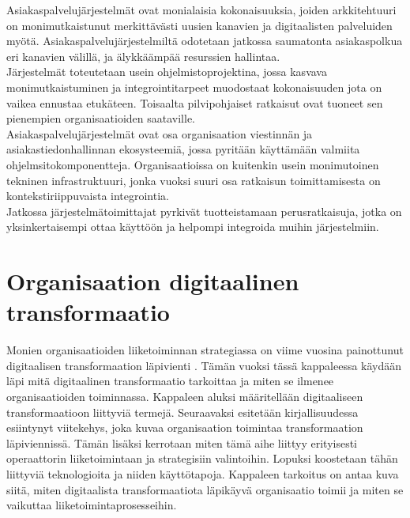 \documentclass[finnish,12pt,a4paper,pdftex]{article}
\begin{document}
Asiakaspalvelujärjestelmät ovat monialaisia kokonaisuuksia, joiden arkkitehtuuri on monimutkaistunut merkittävästi uusien kanavien ja digitaalisten palveluiden myötä. Asiakaspalvelujärjestelmiltä odotetaan jatkossa saumatonta asiakaspolkua eri kanavien välillä, ja älykkäämpää resurssien hallintaa. \\

Järjestelmät toteutetaan usein ohjelmistoprojektina, jossa kasvava monimutkaistuminen ja integrointitarpeet muodostaat kokonaisuuden jota on vaikea ennustaa etukäteen. Toisaalta pilvipohjaiset ratkaisut ovat tuoneet sen pienempien organisaatioiden saataville.\\

Asiakaspalvelujärjestelmät ovat osa organisaation viestinnän ja asiakastiedonhallinnan ekosysteemiä, jossa pyritään käyttämään valmiita ohjelmsitokomponentteja. Organisaatioissa on kuitenkin usein monimutoinen tekninen infrastruktuuri, jonka vuoksi suuri osa ratkaisun toimittamisesta on kontekstiriippuvaista integrointia.\\

Jatkossa järjestelmätoimittajat pyrkivät tuotteistamaan perusratkaisuja, jotka on yksinkertaisempi ottaa käyttöön ja helpompi integroida muihin järjestelmiin.




\section{Organisaation digitaalinen transformaatio}
Monien organisaatioiden liiketoiminnan strategiassa on viime vuosina painottunut digitaalisen transformaation läpivienti \citep{lamoureux}. Tämän vuoksi tässä kappaleessa käydään läpi mitä digitaalinen transformaatio tarkoittaa ja miten se ilmenee organisaatioiden toiminnassa. Kappaleen aluksi määritellään digitaaliseen transformaatioon liittyviä termejä. Seuraavaksi esitetään kirjallisuudessa esiintynyt viitekehys, joka kuvaa organisaation toimintaa transformaation läpiviennissä. Tämän lisäksi kerrotaan miten tämä aihe liittyy erityisesti operaattorin liiketoimintaan ja strategisiin valintoihin. Lopuksi koostetaan tähän liittyviä teknologioita ja niiden käyttötapoja. Kappaleen tarkoitus on antaa kuva siitä, miten digitaalista transformaatiota läpikäyvä organisaatio toimii ja miten se vaikuttaa liiketoimintaprosesseihin.\\
\end{document}
